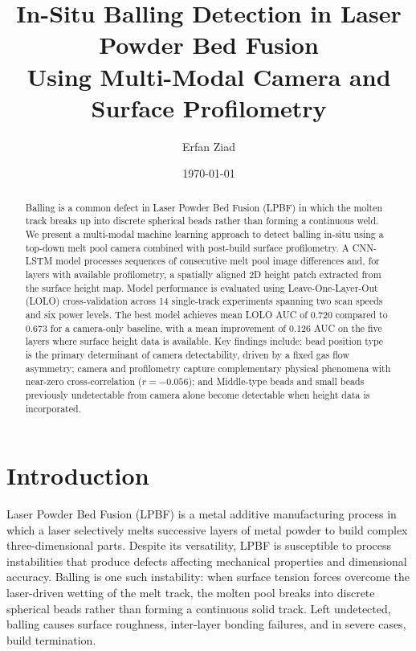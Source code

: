 \documentclass[12pt, letterpaper]{article}
\title{\textbf{In-Situ Balling Detection in Laser Powder Bed Fusion\\
Using Multi-Modal Camera and Surface Profilometry}}
\author{Erfan Ziad}
\date{\today}
\begin{document}
\maketitle

\begin{abstract}
Balling is a common defect in Laser Powder Bed Fusion (LPBF) in which
the molten track breaks up into discrete spherical beads rather than
forming a continuous weld. We present a multi-modal machine learning
approach to detect balling in-situ using a top-down melt pool camera
combined with post-build surface profilometry. A CNN-LSTM model
processes sequences of consecutive melt pool image differences and,
for layers with available profilometry, a spatially aligned 2D height
patch extracted from the surface height map. Model performance is
evaluated using Leave-One-Layer-Out (LOLO) cross-validation across
14 single-track experiments spanning two scan speeds and six power
levels. The best model achieves mean LOLO AUC of 0.720 compared to
0.673 for a camera-only baseline, with a mean improvement of 0.126
AUC on the five layers where surface height data is available.
Key findings include: bead position type is the primary determinant
of camera detectability, driven by a fixed gas flow asymmetry;
camera and profilometry capture complementary physical phenomena
with near-zero cross-correlation ($r = -0.056$); and Middle-type
beads and small beads previously undetectable from camera alone
become detectable when height data is incorporated.
\end{abstract}

\section{Introduction}

Laser Powder Bed Fusion (LPBF) is a metal additive manufacturing
process in which a laser selectively melts successive layers of
metal powder to build complex three-dimensional parts. Despite its
versatility, LPBF is susceptible to process instabilities that
produce defects affecting mechanical properties and dimensional
accuracy. Balling is one such instability: when surface tension
forces overcome the laser-driven wetting of the melt track, the
molten pool breaks into discrete spherical beads rather than
forming a continuous solid track. Left undetected, balling causes
surface roughness, inter-layer bonding failures, and in severe
cases, build termination.
\end{document}
